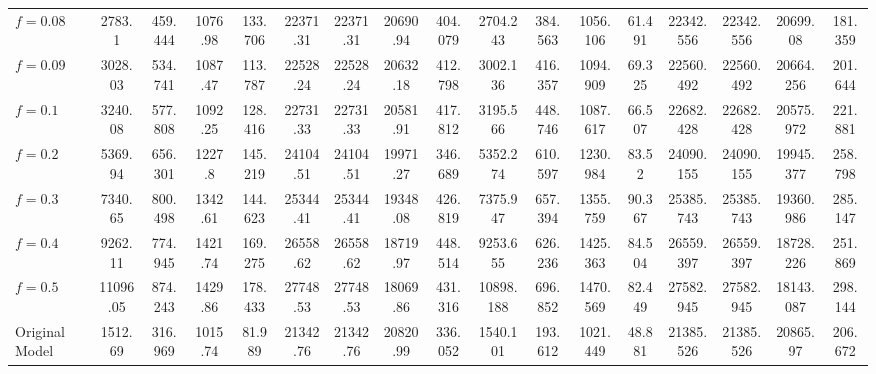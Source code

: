 \begin{tabular}{@{}lcccccccccccccccc@{}}
$f = 0.08$ & 2783.1 & 459.444 & 1076.98 & 133.706 & 22371.31 & 22371.31 & 20690.94 & 404.079 & 2704.243 & 384.563 & 1056.106 & 61.491 & 22342.556 & 22342.556 & 20699.08 & 181.359 \\
$f = 0.09$ & 3028.03 & 534.741 & 1087.47 & 113.787 & 22528.24 & 22528.24 & 20632.18 & 412.798 & 3002.136 & 416.357 & 1094.909 & 69.325 & 22560.492 & 22560.492 & 20664.256 & 201.644 \\
$f = 0.1$ & 3240.08 & 577.808 & 1092.25 & 128.416 & 22731.33 & 22731.33 & 20581.91 & 417.812 & 3195.566 & 448.746 & 1087.617 & 66.507 & 22682.428 & 22682.428 & 20575.972 & 221.881 \\
$f = 0.2$ & 5369.94 & 656.301 & 1227.8 & 145.219 & 24104.51 & 24104.51 & 19971.27 & 346.689 & 5352.274 & 610.597 & 1230.984 & 83.52 & 24090.155 & 24090.155 & 19945.377 & 258.798 \\
$f = 0.3$ & 7340.65 & 800.498 & 1342.61 & 144.623 & 25344.41 & 25344.41 & 19348.08 & 426.819 & 7375.947 & 657.394 & 1355.759 & 90.367 & 25385.743 & 25385.743 & 19360.986 & 285.147 \\
$f = 0.4$ & 9262.11 & 774.945 & 1421.74 & 169.275 & 26558.62 & 26558.62 & 18719.97 & 448.514 & 9253.655 & 626.236 & 1425.363 & 84.504 & 26559.397 & 26559.397 & 18728.226 & 251.869 \\
$f = 0.5$ & 11096.05 & 874.243 & 1429.86 & 178.433 & 27748.53 & 27748.53 & 18069.86 & 431.316 & 10898.188 & 696.852 & 1470.569 & 82.449 & 27582.945 & 27582.945 & 18143.087 & 298.144 \\
Original Model & 1512.69 & 316.969 & 1015.74 & 81.989 & 21342.76 & 21342.76 & 20820.99 & 336.052 & 1540.101 & 193.612 & 1021.449 & 48.881 & 21385.526 & 21385.526 & 20865.97 & 206.672 \\
\bottomrule
\end{tabular}
